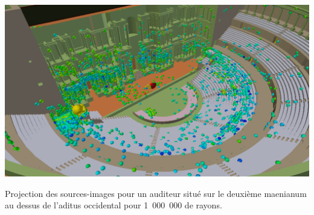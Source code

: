 \begin{figureth}
	\includegraphics[width=\linewidth]{images/Listener10}
	\caption{Projection des sources-images pour un auditeur situé sur le deuxième \gls{maenianum} au dessus de l'\gls{aditus} occidental pour 1~000~000 de rayons.}
	\label{listener10}
\end{figureth}
%

